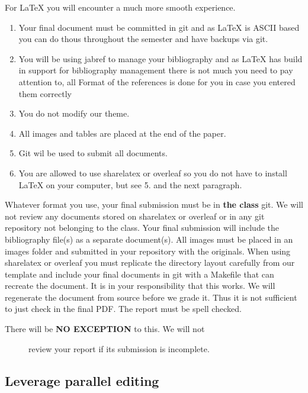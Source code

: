 For LaTeX you will encounter a much more smooth experience.

\begin{enumerate}
\def\labelenumi{\arabic{enumi}.}

\item
  Your final document must be committed in git and as LaTeX is ASCII
  based you can do thous throughout the semester and have backups via
  git.
\item
  You will be using jabref to manage your bibliography and as LaTeX has
  build in support for bibliography management there is not much you
  need to pay attention to, all Format of the references is done for you
  in case you entered them correctly
\item
  You do not modify our theme.
\item
  All images and tables are placed at the end of the paper.
\item
  Git wil be used to submit all documents.
\item
  You are allowed to use sharelatex or overleaf so you do not have to
  install LaTeX on your computer, but see 5. and the next paragraph.
\end{enumerate}

Whatever format you use, your final submission must be in \textbf{the
class} git. We will not review any documents stored on sharelatex or
overleaf or in any git repository not belonging to the class. Your final
submission will include the bibliography file(s) as a separate
document(s). All images must be placed in an images folder and submitted
in your repository with the originals. When using sharelatex or overleaf
you must replicate the directory layout carefully from our template and
include your final documents in git with a Makefile that can recreate
the document. It is in your responsibility that this works. We will
regenerate the document from source before we grade it. Thus it is not
sufficient to just check in the final PDF. The report must be spell
checked.

\begin{description}
\item[There will be \textbf{NO EXCEPTION} to this. We will not]
review your report if its submission is incomplete.
\end{description}

\subsection{Leverage parallel editing}\label{leverage-parallel-editing}

